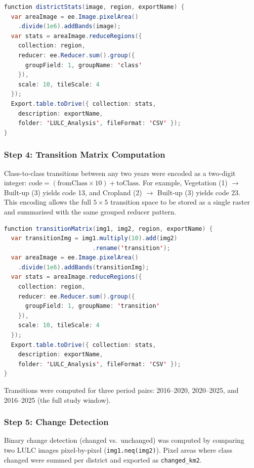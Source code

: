 \documentclass[12pt,a4paper]{article}
\begin{document}
\begin{lstlisting}[language=Java, caption={District-level area statistics function}, label={lst:distStats}]
function districtStats(image, region, exportName) {
  var areaImage = ee.Image.pixelArea()
    .divide(1e6).addBands(image);
  var stats = areaImage.reduceRegions({
    collection: region,
    reducer: ee.Reducer.sum().group({
      groupField: 1, groupName: 'class'
    }),
    scale: 10, tileScale: 4
  });
  Export.table.toDrive({ collection: stats,
    description: exportName,
    folder: 'LULC_Analysis', fileFormat: 'CSV' });
}
\end{lstlisting}

\subsubsection{Step 4: Transition Matrix Computation}
Class-to-class transitions between any two years were encoded as a two-digit integer: $\text{code} = (\text{fromClass} \times 10) + \text{toClass}$. For example, Vegetation (1) $\to$ Built-up (3) yields code 13, and Cropland (2) $\to$ Built-up (3) yields code 23. This encoding allows the full $5 \times 5$ transition space to be stored as a single raster and summarised with the same grouped reducer pattern.

\begin{lstlisting}[language=Java, caption={Transition matrix encoding}, label={lst:transition}]
function transitionMatrix(img1, img2, region, exportName) {
  var transitionImg = img1.multiply(10).add(img2)
                         .rename('transition');
  var areaImage = ee.Image.pixelArea()
    .divide(1e6).addBands(transitionImg);
  var stats = areaImage.reduceRegions({
    collection: region,
    reducer: ee.Reducer.sum().group({
      groupField: 1, groupName: 'transition'
    }),
    scale: 10, tileScale: 4
  });
  Export.table.toDrive({ collection: stats,
    description: exportName,
    folder: 'LULC_Analysis', fileFormat: 'CSV' });
}
\end{lstlisting}

Transitions were computed for three period pairs: 2016--2020, 2020--2025, and 2016--2025 (the full study window).

\subsubsection{Step 5: Change Detection}
Binary change detection (changed vs.\ unchanged) was computed by comparing two LULC images pixel-by-pixel (\texttt{img1.neq(img2)}). Pixel areas where class changed were summed per district and exported as \texttt{changed\_km2}.
\end{document}
